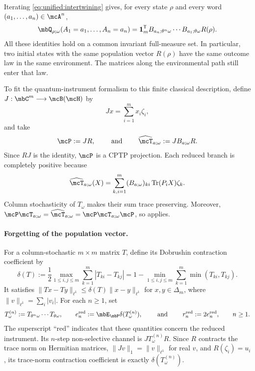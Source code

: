 \documentclass[a4paper]{article}
\numberwithin{equation}{section}   %
\theoremstyle{plain}   %
\theoremstyle{plain}   %
\theoremstyle{examplestyle}
\DeclareMathOperator{\pr}{\mbP}           %
\begin{document}
        Iterating \eqref{eq:unified:intertwining} gives, for every state $\rho$ and every word $(a_1,\ldots,a_n)\in\mcA^n$,
        \begin{equation}
        \label{eq:unified:classical-law}
             \mbQ_{\rho;\omega}(A_1=a_1,\ldots,A_n=a_n)
             =\mathbf1_m^{\mathsf T}B_{a_n;\theta^n\omega}\cdots
               B_{a_1;\theta\omega}R(\rho).
        \end{equation}
        All these identities hold on a common invariant full-measure set.
        In particular, two initial states with the same population vector $R(\rho)$ have the same outcome law in the same environment.
        The matrices along the environmental path still enter that law.

        To fit the quantum-instrument formalism to this finite classical description, define $J:\mbC^m\longrightarrow\mcB(\mcH)$ by
        \[
            Jx=\sum_{i=1}^m x_i\zeta_i,
        \]
        and take 
        \[
            \mcP:=JR,
                \qquad\text{ and }\qquad 
            \widehat{\mcT}_{a;\omega}:=JB_{a;\omega}R.
        \]
        Since $RJ$ is the identity, $\mcP$ is a CPTP projection.
        Each reduced branch is completely positive because
        \[
         \widehat{\mcT}_{a;\omega}(X)
         =\sum_{k,i=1}^m(B_{a;\omega})_{ki}
               \operatorname{Tr}(P_iX)\zeta_k.
        \]
        Column stochasticity of $T_\omega$ makes their sum trace preserving.
        Moreover, $\mcP\mcT_{a;\omega}
        =\widehat{\mcT}_{a;\omega}
        =\mcP\mcT_{a;\omega}\mcP$, so
         applies.

    \paragraph{Forgetting of the population vector.}
        For a column-stochastic $m\times m$ matrix $T$, define its Dobrushin contraction coefficient by
        \[
             \delta(T)
             :=\frac12\max_{1\le i,j\le m}
                \sum_{k=1}^m|T_{ki}-T_{kj}|
             =1-\min_{1\le i,j\le m}\sum_{k=1}^m\min(T_{ki},T_{kj}).
        \]
        It satisfies $\|Tx-Ty\|_{\ell^1}\le\delta(T)\|x-y\|_{\ell^1}$ for $x,y\in\Delta_m$, where $\|v\|_{\ell^1}=\sum_i|v_i|$.
        For each $n\ge 1$, set
        \[
             T_\omega^{(n)}:=T_{\theta^n\omega}\cdots T_{\theta\omega},
             \qquad e_n^{\mathrm{red}}:=\mbE_{\pr}\delta(T_\omega^{(n)}),
             \qquad \text{ and }\qquad  r_n^{\mathrm{red}}:=2e_n^{\mathrm{red}},\qquad n\ge1.
        \]
        The superscript ``$\mathrm{red}$'' indicates that these quantities concern the reduced instrument. 
        Its $n$-step non-selective channel is $JT_\omega^{(n)}R$. 
        Since $R$ contracts the trace norm on Hermitian matrices, $\|Jv\|_1=\|v\|_{\ell^1}$ for real $v$, and  $R(\zeta_i)=u_i$, its trace-norm contraction coefficient is exactly $\delta(T_\omega^{(n)})$.
        
\end{document}

